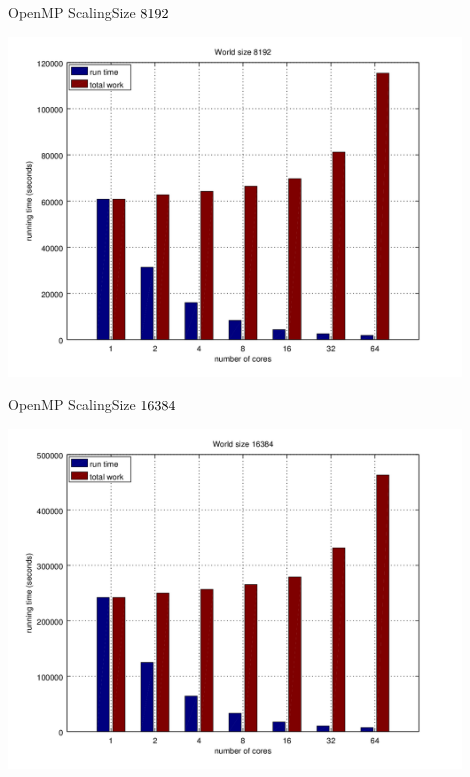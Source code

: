 \documentclass{beamer}
\begin{document}
\begin{frame}{OpenMP Scaling}{Size $8192 \time 8192$}
    \begin{center}
        \includegraphics[width=0.9\textwidth]{scaling-8192}
    \end{center}
\end{frame}

\begin{frame}{OpenMP Scaling}{Size $16384 \time 16384$}
    \begin{center}
        \includegraphics[width=0.9\textwidth]{scaling-16384}
    \end{center}
\end{frame}
\end{document}
